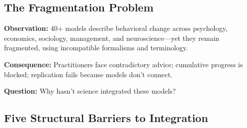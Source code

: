\subsection{The Fragmentation Problem}

\begin{tcolorbox}[colback=red!5!white, colframe=red!75!black,
    title=The Core Problem]
\textbf{Observation:} 40+ models describe behavioral change across psychology, economics, sociology, management, and neuroscience---yet they remain fragmented, using incompatible formalisms and terminology.

\textbf{Consequence:} Practitioners face contradictory advice; cumulative progress is blocked; replication fails because models don't connect.

\textbf{Question:} Why hasn't science integrated these models?
\end{tcolorbox}

\subsection{Five Structural Barriers to Integration}


